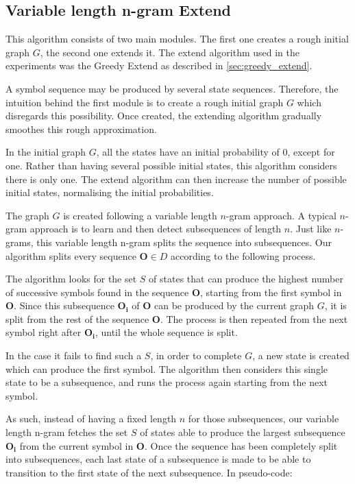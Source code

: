 \subsection{Variable length n-gram Extend}
\label{sec:vl-ngram-extend}
This algorithm consists of two main modules. The first one creates a rough initial graph $G$, the second one extends it. The extend algorithm used in the experiments was the Greedy Extend as described in \ref{sec:greedy_extend}.

A symbol sequence may be produced by several state sequences. Therefore, the intuition behind the first module is to create a rough initial graph $G$ which disregards this possibility. Once created, the extending algorithm gradually smoothes this rough approximation.

In the initial graph $G$, all the states have an initial probability of 0, except for one. Rather than having several possible initial states, this algorithm considers there is only one. The extend algorithm can then increase the number of possible initial states, normalising the initial probabilities.

The graph $G$ is created following a variable length $n$-gram approach. A typical $n$-gram approach is to learn and then detect subsequences of length $n$. Just like $n$-grams, this variable length n-gram splits the sequence into subsequences. Our algorithm splits every sequence $\mathbf{O}\in D$ according to the following process.

The algorithm looks for the set $S$ of states that can produce the highest number of successive symbols found in the sequence $\mathbf{O}$, starting from the first symbol in $\mathbf{O}$. Since this subsequence $\mathbf{O_i}$ of $\mathbf{O}$ can be produced by the current graph $G$, it is split from the rest of the sequence $\mathbf{O}$. The process is then repeated from the next symbol right after $\mathbf{O_i}$, until the whole sequence is split.

In the case it fails to find such a $S$, in order to complete $G$, a new state is created which can produce the first symbol. The algorithm then considers this single state to be a subsequence, and runs the process again starting from the next symbol.

As such, instead of having a fixed length $n$ for those subsequences, our variable length n-gram fetches the set $S$ of states able to produce the largest subsequence $\mathbf{O_i}$ from the current symbol in $\mathbf{O}$. Once the sequence has been completely split into subsequences, each last state of a subsequence is made to be able to transition to the first state of the next subsequence. In pseudo-code:

